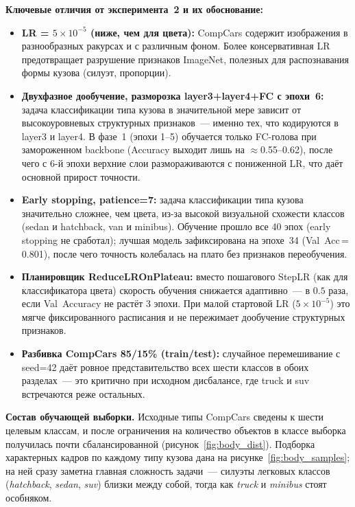 \documentclass[10pt,a4paper]{report}
\numberwithin{equation}{chapter}
\numberwithin{figure}{chapter}
\numberwithin{table}{chapter}
\begin{document}
\textbf{Ключевые отличия от эксперимента~2 и их обоснование:}
\begin{itemize}
  \item \textbf{LR = $5\times10^{-5}$ (ниже, чем для цвета):}
    CompCars содержит изображения в разнообразных ракурсах и с
    различным фоном. Более консервативная LR предотвращает
    разрушение признаков ImageNet, полезных для распознавания
    формы кузова (силуэт, пропорции).

  \item \textbf{Двухфазное дообучение, разморозка layer3+layer4+FC с эпохи~6:}
    задача классификации типа кузова в значительной мере зависит
    от высокоуровневых структурных признаков~--- именно тех, что
    кодируются в layer3 и layer4. В фазе~1 (эпохи 1--5) обучается
    только FC-голова при замороженном backbone (Accuracy выходит
    лишь на $\approx$0.55--0.62), после чего с 6-й эпохи верхние
    слои размораживаются с пониженной LR, что даёт основной прирост
    точности.

  \item \textbf{Early stopping, patience=7:}
    задача классификации типа кузова значительно сложнее, чем
    цвета, из-за высокой визуальной схожести классов
    (sedan и hatchback, van и minibus). Обучение
    прошло все 40 эпох (early stopping не сработал); лучшая
    модель зафиксирована на эпохе~34 (Val~Acc\,=\,0.801), после
    чего точность колебалась на плато без признаков переобучения.

  \item \textbf{Планировщик ReduceLROnPlateau:} вместо пошагового StepLR
    (как для классификатора цвета) скорость обучения снижается адаптивно~---
    в $0.5$ раза, если Val~Accuracy не растёт 3 эпохи. При малой стартовой
    LR ($5\times10^{-5}$) это мягче фиксированного расписания и не пережимает
    дообучение структурных признаков.

  \item \textbf{Разбивка CompCars 85/15\% (train/test):} случайное
    перемешивание с seed=42 даёт ровное представительство всех шести
    классов в обоих разделах~--- это критично при исходном дисбалансе,
    где truck и suv встречаются реже остальных.
\end{itemize}

\textbf{Состав обучающей выборки.}
Исходные типы CompCars сведены к шести целевым классам, и после
ограничения на количество объектов в классе выборка получилась почти
сбалансированной (рисунок~\ref{fig:body_dist}). Подборка характерных
кадров по каждому типу кузова дана на рисунке~\ref{fig:body_samples};
на ней сразу заметна главная сложность задачи~--- силуэты легковых
классов (\textit{hatchback}, \textit{sedan}, \textit{suv}) близки между
собой, тогда как \textit{truck} и \textit{minibus} стоят особняком.
\end{document}
